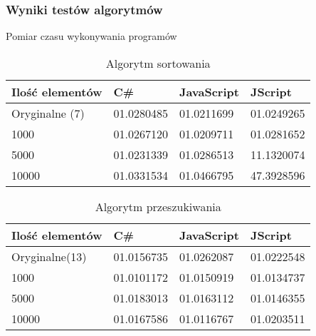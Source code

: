 \begin{frame}
  \frametitle{Wyniki testów algorytmów}
  \begin{block}{Pomiar czasu wykonywania programów}
    \scriptsize
    \begin{table}[h!]
      \centering
      \caption{Algorytm sortowania}
      \begin{tabular}{|l|l|l|l|}
      \hline
      Ilość elementów & C\#              & JavaScript       & JScript          \\ \hline
      Oryginalne (7)  & 01.0280485 & 01.0211699 & 01.0249265 \\ \hline
      1000            & 01.0267120 & 01.0209711 & 01.0281652 \\ \hline
      5000            & 01.0231339 & 01.0286513 & 11.1320074 \\ \hline
      10000           & 01.0331534 & 01.0466795 & 47.3928596 \\ \hline
      \end{tabular}
    \end{table}
    \begin{table}[!h]
      \centering
      \caption{Algorytm przeszukiwania}
      \begin{tabular}{|l|l|l|l|}
      \hline
      Ilość elementów & C\#              & JavaScript       & JScript          \\ \hline
      Oryginalne(13)  & 01.0156735 & 01.0262087 & 01.0222548 \\ \hline
      1000            & 01.0101172 & 01.0150919 & 01.0134737 \\ \hline
      5000            & 01.0183013 & 01.0163112 & 01.0146355 \\ \hline
      10000           & 01.0167586 & 01.0116767 & 01.0203511 \\ \hline
      \end{tabular}
    \end{table}
  \end{block}
\end{frame}

